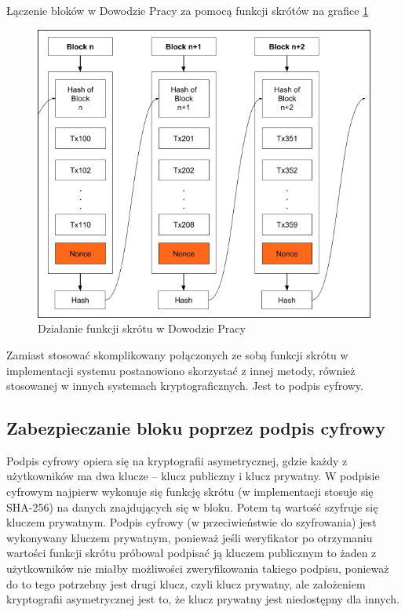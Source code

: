 Łączenie bloków w Dowodzie Pracy za pomocą funkcji skrótów na grafice \ref{fig:ProofOfWorkHash}
\begin{figure}[H]
    \centering
    \includegraphics[width=\textwidth]{Images/ProofOfWorkHash.jpg}
    \caption{Działanie funkcji skrótu w Dowodzie Pracy}
    \label{fig:ProofOfWorkHash}
\end{figure}

Zamiast stosować skomplikowany połączonych ze sobą funkcji skrótu w implementacji systemu postanowiono skorzystać z innej metody, również stosowanej w innych systemach kryptograficznych. Jest to podpis cyfrowy.

\subsection{Zabezpieczanie bloku poprzez podpis cyfrowy}

Podpis cyfrowy opiera się na kryptografii asymetrycznej, gdzie każdy z użytkowników ma dwa klucze – klucz publiczny i klucz prywatny. W podpisie cyfrowym najpierw wykonuje się funkcję skrótu (w implementacji stosuje się SHA-256) na danych znajdujących się w bloku. Potem tą wartość szyfruje się kluczem prywatnym. Podpis cyfrowy (w przeciwieństwie do szyfrowania) jest wykonywany kluczem prywatnym, ponieważ jeśli weryfikator po otrzymaniu wartości funkcji skrótu próbował podpisać ją kluczem publicznym to żaden z użytkowników nie miałby możliwości zweryfikowania takiego podpisu, ponieważ do to tego potrzebny jest drugi klucz, czyli klucz prywatny, ale założeniem kryptografii asymetrycznej jest to, że klucz prywatny jest niedostępny dla innych. 

